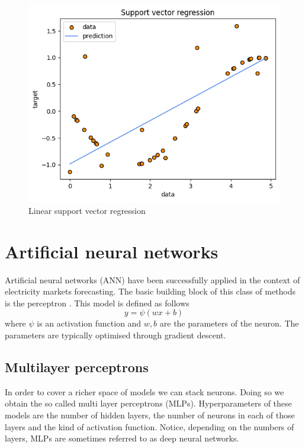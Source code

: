 \\
\begin{figure}
    \includegraphics[width=\textwidth]{images/svr1.png}
    \caption{Linear support vector regression}
    \label{fig:svr1}
\end{figure}

\section{Artificial neural networks}
Artificial neural networks (ANN) have been successfully applied in the context of electricity markets forecasting. The basic building block of this class of methods is the perceptron \cite{rosenblatt1958perceptron}.
This model is defined as follows
\begin{equation}
    y=\psi(wx+b)
\end{equation}
where $\psi$ is an activation function and $w,b$ are the parameters of the neuron. The parameters are typically optimised through gradient descent.

\subsection{Multilayer perceptrons}
In order to cover a richer space of models we can stack neurons. Doing so we obtain the so called multi layer perceptrons (MLPs). Hyperparameters of these models are the number of hidden layers, the number of neurons in each of those layers and the kind of activation function.
Notice, depending on the numbers of layers, MLPs are sometimes referred to as deep neural networks.

